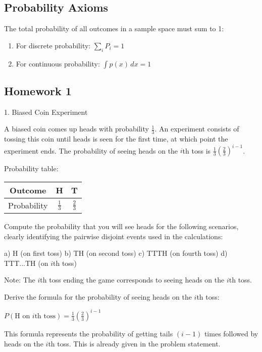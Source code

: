 \documentclass{article}
\begin{document}
\subsection*{Probability Axioms}

The total probability of all outcomes in a sample space must sum to 1:

\begin{enumerate}
    \item For discrete probability: $\sum_{i} P_i = 1$
    \item For continuous probability: $\int p(x) \, dx = 1$
\end{enumerate}

\subsection*{Homework 1}




1. Biased Coin Experiment

A biased coin comes up heads with probability $\frac{1}{3}$. An experiment consists of tossing this coin until heads is seen for the first time, at which point the experiment ends. The probability of seeing heads on the $i$th toss is $\frac{1}{3} \left(\frac{2}{3}\right)^{i-1}$.

Probability table:
\begin{center}
\begin{tabular}{|c|c|c|}
\hline
Outcome & H & T \\
\hline
Probability & $\frac{1}{3}$ & $\frac{2}{3}$ \\
\hline
\end{tabular}
\end{center}

Compute the probability that you will see heads for the following scenarios, clearly identifying the pairwise disjoint events used in the calculations:

a) H (on first toss)
b) TH (on second toss)
c) TTTH (on fourth toss)
d) TTT...TH (on $i$th toss)

Note: The $i$th toss ending the game corresponds to seeing heads on the $i$th toss.

Derive the formula for the probability of seeing heads on the $i$th toss:

$P(\text{H on }i\text{th toss}) = \frac{1}{3} \left(\frac{2}{3}\right)^{i-1}$

This formula represents the probability of getting tails $(i-1)$ times followed by heads on the $i$th toss. This is already given in the problem statement.
\end{document}
